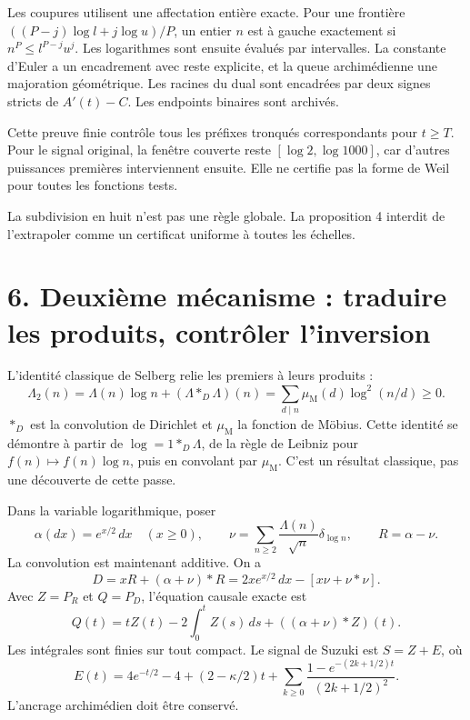 \documentclass[
  11pt,
  a4paper,
]{article}
\begin{document}
Les coupures utilisent une affectation entière exacte. Pour une
frontière \(((P-j)\log l+j\log u)/P\), un entier \(n\) est à gauche
exactement si \(n^P\le l^{P-j}u^j\). Les logarithmes sont ensuite
évalués par intervalles. La constante d'Euler a un encadrement avec
reste explicite, et la queue archimédienne une majoration géométrique.
Les racines du dual sont encadrées par deux signes stricts de
\(A'(t)-C\). Les endpoints binaires sont archivés.

Cette preuve finie contrôle tous les préfixes tronqués correspondants
pour \(t\ge T\). Pour le signal original, la fenêtre couverte reste
\([\log2,\log1000]\), car d'autres puissances premières interviennent
ensuite. Elle ne certifie pas la forme de Weil pour toutes les fonctions
tests.

La subdivision en huit n'est pas une règle globale. La proposition 4
interdit de l'extrapoler comme un certificat uniforme à toutes les
échelles.

\newpage

\hypertarget{deuxiuxe8me-muxe9canisme-traduire-les-produits-contruxf4ler-linversion}{%
\section{6. Deuxième mécanisme : traduire les produits, contrôler
l'inversion}\label{deuxiuxe8me-muxe9canisme-traduire-les-produits-contruxf4ler-linversion}}

L'identité classique de Selberg relie les premiers à leurs produits : \[
\Lambda_2(n)=\Lambda(n)\log n+(\Lambda*_{\!D}\Lambda)(n)
=\sum_{d\mid n}\mu_{\mathrm{M}}(d)\log^2(n/d)\ge0.
\] \(*_{\!D}\) est la convolution de Dirichlet et \(\mu_{\mathrm{M}}\)
la fonction de Möbius. Cette identité se démontre à partir de
\(\log=1*_{\!D}\Lambda\), de la règle de Leibniz pour
\(f(n)\mapsto f(n)\log n\), puis en convolant par \(\mu_{\mathrm{M}}\).
C'est un résultat classique, pas une découverte de cette passe.

Dans la variable logarithmique, poser \[
\alpha(dx)=e^{x/2}\,dx\quad(x\ge0),\qquad
\nu=\sum_{n\ge2}\frac{\Lambda(n)}{\sqrt n}\delta_{\log n},\qquad R=\alpha-\nu.
\] La convolution est maintenant additive. On a \[
D=xR+(\alpha+\nu)*R=2xe^{x/2}\,dx-[x\nu+\nu*\nu].
\] Avec \(Z=P_R\) et \(Q=P_D\), l'équation causale exacte est \[
Q(t)=tZ(t)-2\int_0^tZ(s)\,ds+((\alpha+\nu)*Z)(t).
\] Les intégrales sont finies sur tout compact. Le signal de Suzuki est
\(S=Z+E\), où \[
E(t)=4e^{-t/2}-4+(2-\kappa/2)t
+\sum_{k\ge0}\frac{1-e^{-(2k+1/2)t}}{(2k+1/2)^2}.
\] L'ancrage archimédien doit être conservé.
\end{document}

